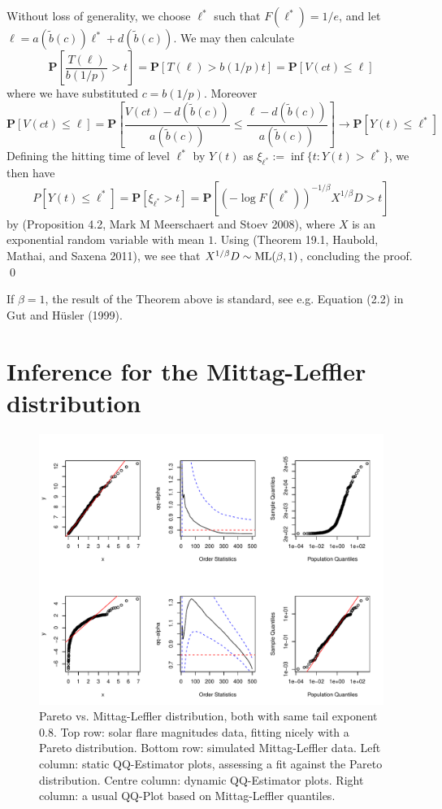 \documentclass[smallextended]{svjour3}       %
\providecommand{\tightlist}{%
  \setlength{\itemsep}{0pt}\setlength{\parskip}{0pt}}
\begin{document}
Without loss of generality, we choose \(\ell^*\) such that
\(F(\ell^*) = 1/e\), and let
\(\ell = a(\tilde b(c)) \ell^* + d(\tilde b(c))\). We may then calculate
\[
\mathbf P\left[ \frac{T(\ell)}{b(1/p)} > t \right]
= \mathbf P[T(\ell) > b(1/p) t]
= \mathbf P[V(ct) \le \ell]
\] where we have substituted \(c = b(1/p)\). Moreover \[
\mathbf P[V(ct) \le \ell]
= \mathbf P\left[ \frac{V(ct) - d(\tilde b(c))}{a(\tilde b(c))} 
\le \frac{\ell - d(\tilde b(c))}{a(\tilde b(c))} \right]
\longrightarrow \mathbf P\left[ Y(t) \le \ell^* \right]
\] Defining the hitting time of level \(\ell^*\) by \(Y(t)\) as
\(\xi_{\ell^*} := \inf\{t: Y(t) > \ell^*\}\), we then have \[
P\left[ Y(t) \le \ell^* \right] = \mathbf P[\xi_{\ell^*} > t] 
= \mathbf P[(-\log F(\ell^*))^{-1/\beta} X^{1/\beta} D > t]
\] by (Proposition 4.2, Mark M Meerschaert and Stoev 2008), where \(X\)
is an exponential random variable with mean \(1\). Using (Theorem 19.1,
Haubold, Mathai, and Saxena 2011), we see that
\(X^{1/\beta} D \sim {\rm ML}(\beta, 1)\), concluding the proof. \qed

\begin{description}
\tightlist
\item[\textbf{Remark:}]
If \(\beta = 1\), the result of the Theorem above is standard, see e.g.
Equation (2.2) in Gut and Hüsler (1999).
\end{description}

\section{Inference for the Mittag-Leffler
distribution}\label{inference-for-the-mittag-leffler-distribution}

\begin{figure}
\includegraphics[width=\textwidth]{article_springer_files/figure-latex/QQ-plots-1} \caption{Pareto vs. Mittag-Leffler distribution, both with same tail exponent 0.8. Top row: solar flare magnitudes data, fitting nicely with a Pareto distribution. Bottom row: simulated Mittag-Leffler data. Left column: static QQ-Estimator plots, assessing a fit against the Pareto distribution. Centre column: dynamic QQ-Estimator plots. Right column: a usual QQ-Plot based on Mittag-Leffler quantiles.\label{fig:QQ-plots}}\label{fig:QQ-plots}
\end{figure}
\end{document}
